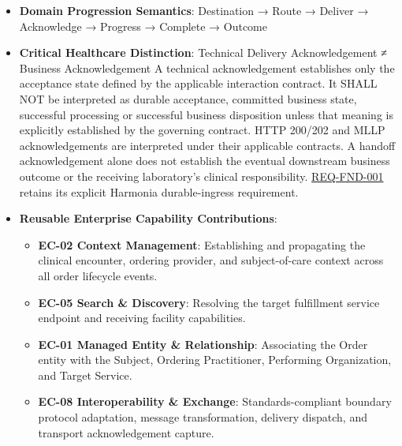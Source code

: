 \begin{itemize}

\item 
\textbf{Domain Progression Semantics}: Destination → Route → Deliver → Acknowledge → Progress → Complete → Outcome



\item 
\textbf{Critical Healthcare Distinction}:  Technical Delivery Acknowledgement ≠  Business Acknowledgement A technical acknowledgement establishes only the acceptance state defined by the applicable interaction contract. It SHALL NOT be interpreted as durable acceptance, committed business state, successful processing or successful business disposition unless that meaning is explicitly established by the governing contract. HTTP 200/\allowbreak{}202 and MLLP acknowledgements are interpreted under their applicable contracts. A handoff acknowledgement alone does not establish the eventual downstream business outcome or the receiving laboratory's clinical responsibility. \href{https://github.com/fhirfactory/harmonia/blob/98410db60155198a75f74c79d98060070209faa1/docs/markdown/01-motivation/requirements-constraints/foundational-requirements.md\#req-fnd-001-durable-ingress-acceptance-boundary}{REQ-FND-001} retains its explicit Harmonia durable-ingress requirement.



\item 
\textbf{Reusable Enterprise Capability Contributions}:


\begin{itemize}

\item 
\textbf{EC-02 Context Management}: Establishing and propagating the clinical encounter, ordering provider, and subject-of-care context across all order lifecycle events.



\item 
\textbf{EC-05 Search \& Discovery}: Resolving the target fulfillment service endpoint and receiving facility capabilities.



\item 
\textbf{EC-01 Managed Entity \& Relationship}: Associating the Order entity with the Subject, Ordering Practitioner, Performing Organization, and Target Service.



\item 
\textbf{EC-08 Interoperability \& Exchange}: Standards-compliant boundary protocol adaptation, message transformation, delivery dispatch, and transport acknowledgement capture.




\end{itemize}
\end{itemize}
